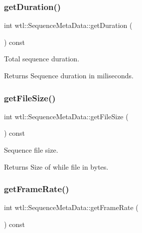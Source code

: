 \subsubsection{\texorpdfstring{get\+Duration()}{getDuration()}}
{\footnotesize\ttfamily int wtl\+::\+Sequence\+Meta\+Data\+::get\+Duration (\begin{DoxyParamCaption}{ }\end{DoxyParamCaption}) const}



Total sequence duration. 

\begin{DoxyReturn}{Returns}
Sequence duration in miliseconds. 
\end{DoxyReturn}
\mbox{\label{classwtl_1_1_sequence_meta_data_a24e3ad706253552c32204774227aefd3}} 
\subsubsection{\texorpdfstring{get\+File\+Size()}{getFileSize()}}
{\footnotesize\ttfamily int wtl\+::\+Sequence\+Meta\+Data\+::get\+File\+Size (\begin{DoxyParamCaption}{ }\end{DoxyParamCaption}) const}



Sequence file size. 

\begin{DoxyReturn}{Returns}
Size of while file in bytes. 
\end{DoxyReturn}
\mbox{\label{classwtl_1_1_sequence_meta_data_ad9793ec615f6544465c30c150182a4e3}} 
\subsubsection{\texorpdfstring{get\+Frame\+Rate()}{getFrameRate()}}
{\footnotesize\ttfamily int wtl\+::\+Sequence\+Meta\+Data\+::get\+Frame\+Rate (\begin{DoxyParamCaption}{ }\end{DoxyParamCaption}) const}



